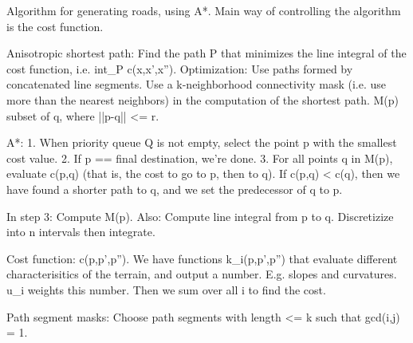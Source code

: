 Algorithm for generating roads, using A*. Main way of controlling the algorithm is the cost function.

Anisotropic shortest path: Find the path P that minimizes the line integral of the cost function, i.e. int_P c(x,x',x''). Optimization: Use paths formed by concatenated line segments. Use a k-neighborhood connectivity mask (i.e. use more than the nearest neighbors) in the computation of the shortest path. M(p) subset of {q, where ||p-q|| <= r}.

A*:
1. When priority queue Q is not empty, select the point p with the smallest cost value.
2. If p == final destination, we're done.
3. For all points q in M(p), evaluate c(p,q) (that is, the cost to go to p, then to q). If c(p,q) < c(q), then we have found a shorter path to q, and we set the predecessor of q to p.

In step 3: Compute M(p). Also: Compute line integral from p to q. Discretizize into n intervals then integrate.

Cost function: c(p,p',p''). We have functions k_i(p,p',p'') that evaluate different characterisitics of the terrain, and output a number. E.g. slopes and curvatures. u_i weights this number. Then we sum over all i to find the cost.

Path segment masks: Choose path segments with length <= k such that gcd(i,j) = 1. 
